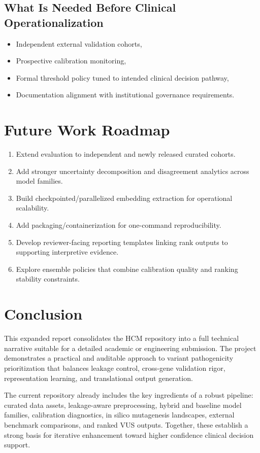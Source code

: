 \documentclass[11pt,a4paper]{article}
\begin{document}
\subsection{What Is Needed Before Clinical Operationalization}
\begin{itemize}[leftmargin=1.2cm]
    \item Independent external validation cohorts,
    \item Prospective calibration monitoring,
    \item Formal threshold policy tuned to intended clinical decision pathway,
    \item Documentation alignment with institutional governance requirements.
\end{itemize}

\section{Future Work Roadmap}
\begin{enumerate}[leftmargin=1.2cm]
    \item Extend evaluation to independent and newly released curated cohorts.
    \item Add stronger uncertainty decomposition and disagreement analytics across model families.
    \item Build checkpointed/parallelized embedding extraction for operational scalability.
    \item Add packaging/containerization for one-command reproducibility.
    \item Develop reviewer-facing reporting templates linking rank outputs to supporting interpretive evidence.
    \item Explore ensemble policies that combine calibration quality and ranking stability constraints.
\end{enumerate}

\section{Conclusion}
This expanded report consolidates the HCM repository into a full technical narrative suitable for a detailed academic or engineering submission. The project demonstrates a practical and auditable approach to variant pathogenicity prioritization that balances leakage control, cross-gene validation rigor, representation learning, and translational output generation.

The current repository already includes the key ingredients of a robust pipeline: curated data assets, leakage-aware preprocessing, hybrid and baseline model families, calibration diagnostics, in silico mutagenesis landscapes, external benchmark comparisons, and ranked VUS outputs. Together, these establish a strong basis for iterative enhancement toward higher confidence clinical decision support.
\end{document}
